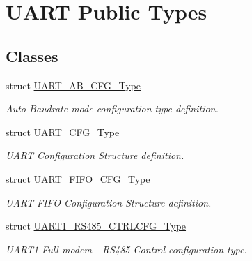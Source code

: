 \hypertarget{group___u_a_r_t___public___types}{}\section{U\+A\+RT Public Types}
\label{group___u_a_r_t___public___types}
\subsection*{Classes}
\begin{DoxyCompactItemize}
\item 
struct \hyperlink{struct_u_a_r_t___a_b___c_f_g___type}{U\+A\+R\+T\+\_\+\+A\+B\+\_\+\+C\+F\+G\+\_\+\+Type}
\begin{DoxyCompactList}\small\item\em Auto Baudrate mode configuration type definition. \end{DoxyCompactList}\item 
struct \hyperlink{struct_u_a_r_t___c_f_g___type}{U\+A\+R\+T\+\_\+\+C\+F\+G\+\_\+\+Type}
\begin{DoxyCompactList}\small\item\em U\+A\+RT Configuration Structure definition. \end{DoxyCompactList}\item 
struct \hyperlink{struct_u_a_r_t___f_i_f_o___c_f_g___type}{U\+A\+R\+T\+\_\+\+F\+I\+F\+O\+\_\+\+C\+F\+G\+\_\+\+Type}
\begin{DoxyCompactList}\small\item\em U\+A\+RT F\+I\+FO Configuration Structure definition. \end{DoxyCompactList}\item 
struct \hyperlink{struct_u_a_r_t1___r_s485___c_t_r_l_c_f_g___type}{U\+A\+R\+T1\+\_\+\+R\+S485\+\_\+\+C\+T\+R\+L\+C\+F\+G\+\_\+\+Type}
\begin{DoxyCompactList}\small\item\em U\+A\+R\+T1 Full modem -\/ R\+S485 Control configuration type. \end{DoxyCompactList}\end{DoxyCompactItemize}
